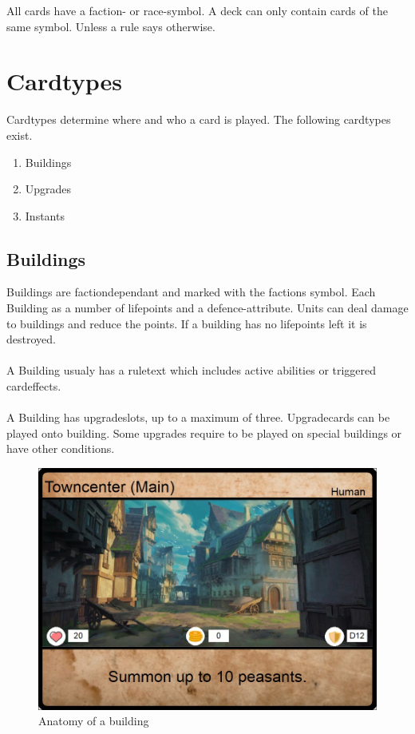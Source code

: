 \documentclass[a5paper,pagesize,10pt,bibtotoc,pointlessnumbers,
normalheadings,DIV=9,twoside=false]{scrbook}
\begin{document}
All cards have a faction- or race-symbol. A deck can only contain cards of the same symbol. Unless a rule says otherwise.

\section{Cardtypes}
Cardtypes determine where and who a card is played. The following cardtypes exist.

\begin{enumerate}
\item Buildings
\item Upgrades
\item Instants
\end{enumerate}

\subsection{Buildings}
Buildings are factiondependant and marked with the factions symbol. Each Building as a number of lifepoints and a defence-attribute.
Units can deal damage to buildings and reduce the points. If a building has no lifepoints left it is destroyed.\\
\\
A Building usualy has a ruletext which includes active abilities or triggered cardeffects.\\
\\
A Building has upgradeslots, up to a maximum of three.
Upgradecards can be played onto building. Some upgrades require to be played on special buildings or have other conditions.

\begin{figure}[t]
\includegraphics[scale=1.0]{examplebuilding}
\centering
\caption{Anatomy of a building}
\end{figure}
\end{document}
